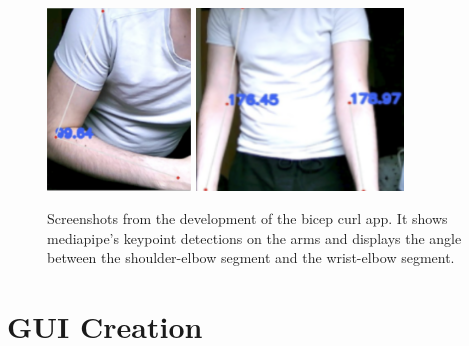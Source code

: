     \begin{figure}[htbp]
            \centering
            \includegraphics[width=0.34\textwidth]{figures/Screenshot 2024-08-18 at 19.07.46.png}
            \includegraphics[width=0.49\textwidth]{figures/Screenshot 2024-08-18 at 19.08.36.png}
            \caption{Screenshots from the development of the bicep curl app. It shows mediapipe's keypoint detections on the arms and displays the angle between the shoulder-elbow segment and the wrist-elbow segment.}
            \label{fig:detections}
    \end{figure}
        
\section{GUI Creation}

